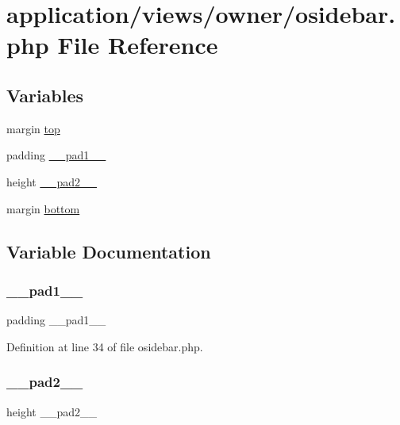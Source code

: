 \hypertarget{osidebar_8php}{}\section{application/views/owner/osidebar.php File Reference}
\label{osidebar_8php}
\subsection*{Variables}
\begin{DoxyCompactItemize}
\item 
margin \mbox{\hyperlink{osidebar_8php_a92a4f9c60f5fc724a2e9a4fdb35e9777}{top}}
\item 
padding \mbox{\hyperlink{osidebar_8php_aa5cd2155ac03abebb317ba2a8dfb5b46}{\+\_\+\+\_\+pad1\+\_\+\+\_\+}}
\item 
height \mbox{\hyperlink{osidebar_8php_af7dc46632d54cda776d267d3722f5ca5}{\+\_\+\+\_\+pad2\+\_\+\+\_\+}}
\item 
margin \mbox{\hyperlink{osidebar_8php_a9034efd9266ed643f35aa86e8ca32ac2}{bottom}}
\end{DoxyCompactItemize}


\subsection{Variable Documentation}
\mbox{\label{osidebar_8php_aa5cd2155ac03abebb317ba2a8dfb5b46}} 
\subsubsection{\texorpdfstring{\_\_pad1\_\_}{\_\_pad1\_\_}}
{\footnotesize\ttfamily padding \+\_\+\+\_\+pad1\+\_\+\+\_\+}



Definition at line 34 of file osidebar.\+php.

\mbox{\label{osidebar_8php_af7dc46632d54cda776d267d3722f5ca5}} 
\subsubsection{\texorpdfstring{\_\_pad2\_\_}{\_\_pad2\_\_}}
{\footnotesize\ttfamily height \+\_\+\+\_\+pad2\+\_\+\+\_\+}



